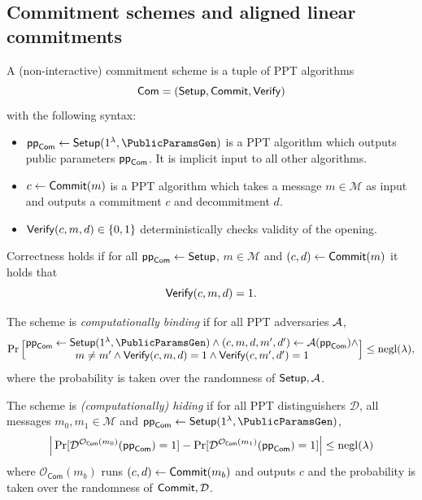 \subsection{Commitment schemes and aligned linear commitments}
\label{subsec:prelim-commit}
\label{subsec:commitments}

\begin{definition}\label{def:commitment-scheme}
A (non-interactive) commitment scheme is a tuple of PPT algorithms
\[
  \mathsf{Com}=(\mathsf{Setup},\mathsf{Commit},\mathsf{Verify})
\]
with the following syntax:
\begin{itemize}[leftmargin=1.25em]
  \item $\ComPublicParam\gets \ComSetup(\SecParam,\PublicParamsGen)$ is a PPT algorithm which outputs public parameters $\mathsf{pp}_{\mathsf{Com}}$. It is implicit input to all other algorithms.
  \item $c \gets \mathsf{Commit}(m)$ is a PPT algorithm which takes a message $m\in\mathcal{M}$ as input and outputs a commitment $c$ and decommitment $d$.
  \item $\mathsf{Verify}(c,m,d)\in\{0,1\}$ deterministically checks validity of the opening.
\end{itemize}
Correctness holds if for all $\mathsf{pp}_{\mathsf{Com}}\gets \mathsf{Setup}$,  $m\in \mathcal{M}$ and $(c,d)\gets \mathsf{Commit}(m)$ it holds that
\[
  \mathsf{Verify}(c,m,d)=1.
\]

The scheme is \emph{computationally binding} if for all PPT adversaries $\mathcal{A}$,
\[
  \Pr\Big[\begin{matrix}
  	\ComPublicParam \gets \ComSetup(\SecParam,\PublicParamsGen) \wedge (c,m,d,m',d')\gets \Adv(\ComPublicParam) \wedge  \\
  	m\neq m' \wedge \ComVerify(c,m,d)=1 \wedge \ComVerify(c,m',d')=1
  \end{matrix}
   \Big]\le \negl(\lambda),
\]
where the probability is taken over the randomness of $\mathsf{Setup},\mathcal{A}$.

The scheme is \emph{(computationally) hiding} if for all PPT distinguishers $\mathcal{D}$, all 
messages $m_0,m_1\in\mathcal{M}$ and $\ComPublicParam\gets \ComSetup(\SecParam,\PublicParamsGen)$,
\[
  \Big|\Pr[\mathcal{D}^{\mathcal{O}_{\mathsf{Com}}(m_0)}(\mathsf{pp}_{\mathsf{Com}})=1]
  -\Pr[\mathcal{D}^{\mathcal{O}_{\mathsf{Com}}(m_1)}(\mathsf{pp}_{\mathsf{Com}})=1]\Big|\le \mathrm{negl}(\lambda)
\]
where $\mathcal{O}_{\mathsf{Com}}(m_b)$ runs $(c,d)\gets \mathsf{Commit}(m_b)$ and outputs $c$ and the probability is taken over the randomness of $\mathsf{Commit},\mathcal{D}$.
\end{definition}

